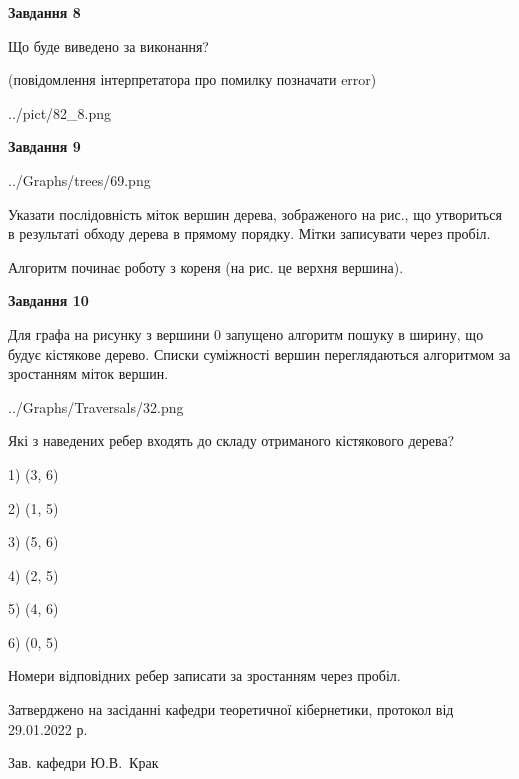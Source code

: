 \documentclass[12pt, ukrainian]{article}
\begin{document}
{\begin {large}
{\begin {center}\textbf{Завдання 8}\end {center}}\par
Що буде виведено за виконання?\par
 (повідомлення інтерпретатора про помилку позначати error)\par
\begin{center}
	{../pict/82_8.png}
\end{center}
\newpage

{\begin {center}\textbf{Завдання 9}\end {center}}\par

\begin{center}
	{../Graphs/trees/69.png}
\end{center}
Указати послідовність міток вершин дерева, зображеного на рис., що утвориться в результаті обходу дерева в прямому порядку. Мітки записувати через пробіл.\par Алгоритм починає роботу з кореня (на рис. це верхня вершина).\par
\newpage

{\begin {center}\textbf{Завдання 10}\end {center}}\par
Для графа на рисунку з вершини 0 запущено алгоритм пошуку в ширину, що будує кістякове дерево. Списки суміжності вершин переглядаються алгоритмом за зростанням міток вершин.\par
\begin{center}
	{../Graphs/Traversals/32.png}
\end{center}
\par Які з наведених ребер входять до складу отриманого кістякового дерева?\par
1) (3, 6)\par
2) (1, 5)\par
3) (5, 6)\par
4) (2, 5)\par
5) (4, 6)\par
6) (0, 5)\par
{\vskip 15pt} Номери відповідних ребер записати за зростанням через пробіл.\par
\newpage


\end {large}
}
{\smallskip \begin {small} Затверджено на засіданні кафедри теоретичної кібернетики, протокол  від   29.01.2022 р.\par\smallskip\smallskip
{\parbox {6.5 cm}{Зав. кафедри \dotfill Ю.В.~Крак}} \end{small}}
\end{document}

